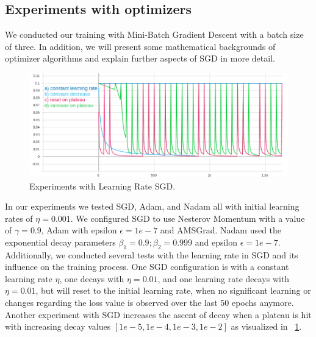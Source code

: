 \subsection*{Experiments with optimizers}
We conducted our training with Mini-Batch Gradient Descent with a batch size of three.
In addition, we will present some mathematical backgrounds of optimizer algorithms and explain further aspects of
SGD in more detail.
\begin{figure}[H]
    \centering
    \includegraphics[width=\textwidth,height=\textheight,keepaspectratio]{img/learning_rate2.png}
    \decoRule
    \caption[Experiments: Learning Rate SGD]{Experiments with Learning Rate SGD.}
    \label{fig:sgd-learning-rate}
\end{figure}
In our experiments we tested SGD, Adam, and Nadam all with initial learning rates of $\eta=0.001$.
We configured SGD to use Nesterov Momentum with a value of $\gamma=0.9$, Adam with epsilon $\epsilon=1e-7$ and AMSGrad.
Nadam used the exponential decay parameters $\beta_1=0.9; \beta_2=0.999$ and epsilon $\epsilon=1e-7$.
Additionally, we conducted several tests with the learning rate in SGD and its influence on the training process.
One SGD configuration is with a constant learning rate $\eta$, one decays with $\eta=0.01$, and one learning rate
decays with $\eta=0.01$, but will reset to the initial learning rate, when no significant learning or changes regarding
the loss value is observed over the last 50 epochs anymore.
Another experiment with SGD increases the ascent of decay when a plateau is hit with increasing decay values
$[1e-5, 1e-4, 1e-3, 1e-2]$ as visualized in ~\ref{fig:sgd-learning-rate}.




%




